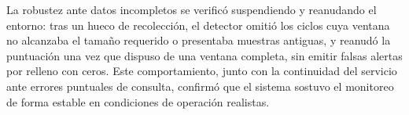La robustez ante datos incompletos se verificó suspendiendo y reanudando el entorno: tras un hueco de recolección, el detector omitió los ciclos cuya ventana no alcanzaba el tamaño requerido o presentaba muestras antiguas, y reanudó la puntuación una vez que dispuso de una ventana completa, sin emitir falsas alertas por relleno con ceros. Este comportamiento, junto con la continuidad del servicio ante errores puntuales de consulta, confirmó que el sistema sostuvo el monitoreo de forma estable en condiciones de operación realistas.
